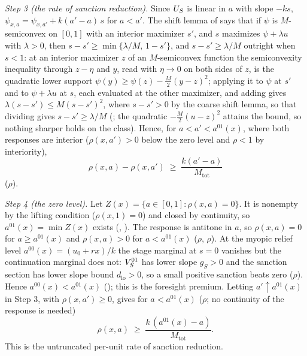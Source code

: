 \emph{Step 3 (the rate of sanction reduction).} Since $U_S$ is linear in $a$ with slope $-ks$,
$\psi_{x,a}=\psi_{x,a'}+k(a'-a)\,s$ for $a<a'$. The shift lemma of
 says that if $\psi$ is
$M$-semiconvex on $[0,1]$ with an interior maximizer $s'$, and $s$ maximizes
$\psi+\lambda u$ with $\lambda>0$, then $s-s'\ge\min\{\lambda/M,\,1-s'\}$,
and $s-s'\ge\lambda/M$ outright when $s<1$: at an interior maximizer $z$ of
an $M$-semiconvex function the semiconvexity inequality through $z-\eta$ and $y$,
read with $\eta\to0$ on both sides of $z$, is the quadratic lower support
$\psi(y)\ge\psi(z)-\tfrac M2(y-z)^2$; applying it to $\psi$ at $s'$ and to
$\psi+\lambda u$ at $s$, each evaluated at the other maximizer, and adding
gives $\lambda(s-s')\le M(s-s')^2$, where $s-s'>0$ by the coarse shift
lemma, so that dividing gives $s-s'\ge\lambda/M$
(; the quadratic
$-\tfrac M2(u-z)^2$ attains the bound, so nothing sharper holds on the
class). Hence, for $a<a'<a^{01}(x)$, where both responses are interior
($\rho(x,a')>0$ below the zero level and $\rho<1$ by interiority),
\[
\rho(x,a)-\rho(x,a')\;\ge\;\frac{k(a'-a)}{M_{\mathrm{tot}}}
\]
($\rho$).

\emph{Step 4 (the zero level).} Let $Z(x)=\{a\in[0,1]:\rho(x,a)=0\}$. It is
nonempty by the lifting condition ($\rho(x,1)=0$) and closed by continuity, so
$a^{01}(x)=\min Z(x)$ exists (, ).
The response is antitone in $a$, so $\rho(x,a)=0$ for $a\ge a^{01}(x)$ and
$\rho(x,a)>0$ for $a<a^{01}(x)$ ($\rho$,
$\rho$). At the myopic relief level $a^{00}(x)=(u_0+rx)/k$
the stage marginal at $s=0$ vanishes but the continuation marginal does not:
$V_S^{01}$ has lower slope $g_S>0$ and the sanction section has lower slope bound
$d_{\mathrm{lo}}>0$, so a small positive sanction beats zero
($\rho$). Hence $a^{00}(x)<a^{01}(x)$
(); this is the foresight premium. Letting
$a'\uparrow a^{01}(x)$ in Step 3, with $\rho(x,a')\ge0$, gives for $a<a^{01}(x)$
($\rho$; no continuity of the response is needed)
\[
\rho(x,a)\;\ge\;\frac{k\,(a^{01}(x)-a)}{M_{\mathrm{tot}}}.
\]
This is the untruncated per-unit rate of sanction reduction.

